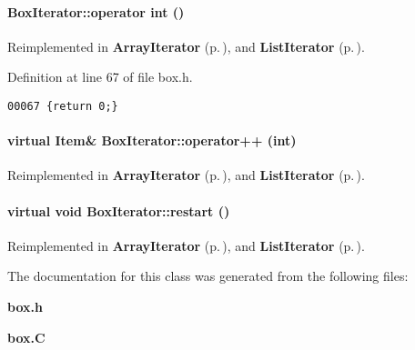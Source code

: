 \paragraph{\setlength{\rightskip}{0pt plus 5cm}Box\-Iterator::operator int ()\hspace{0.3cm}{\tt  [inline, virtual]}}\hfill



Reimplemented in {\bf Array\-Iterator} {\rm (p.\,\pageref{ArrayIterator_a2})}, and {\bf List\-Iterator} {\rm (p.\,\pageref{ListIterator_a2})}.

Definition at line 67 of file box.h.\small\begin{verbatim}00067 {return 0;}
\end{verbatim}\normalsize 
\label{BoxIterator_a5}
\paragraph{\setlength{\rightskip}{0pt plus 5cm}virtual {\bf Item}\& Box\-Iterator::operator++ (int)\hspace{0.3cm}{\tt  [pure virtual]}}\hfill



Reimplemented in {\bf Array\-Iterator} {\rm (p.\,\pageref{ArrayIterator_a5})}, and {\bf List\-Iterator} {\rm (p.\,\pageref{ListIterator_a5})}.\label{BoxIterator_a6}
\paragraph{\setlength{\rightskip}{0pt plus 5cm}virtual void Box\-Iterator::restart ()\hspace{0.3cm}{\tt  [pure virtual]}}\hfill



Reimplemented in {\bf Array\-Iterator} {\rm (p.\,\pageref{ArrayIterator_a6})}, and {\bf List\-Iterator} {\rm (p.\,\pageref{ListIterator_a6})}.

The documentation for this class was generated from the following files:\begin{CompactItemize}
\item 
{\bf box.h}\item 
{\bf box.C}\end{CompactItemize}
